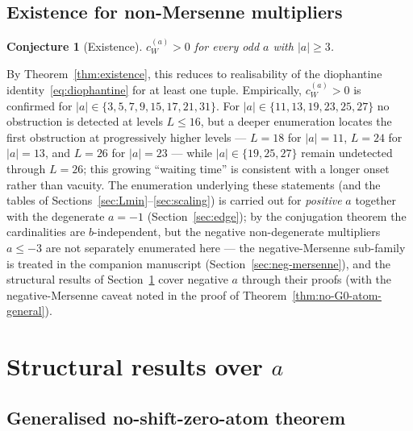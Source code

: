 \documentclass[11pt,reqno]{amsart}
\theoremstyle{plain}
\newtheorem{conjecture}[theorem]{Conjecture}
\theoremstyle{definition}
\theoremstyle{remark}
\newcommand{\cWa}{c_{W}^{(a)}}
\begin{document}
\subsection{Existence for non-Mersenne multipliers}

\begin{conjecture}[Existence]\label{conj:existence}
$\cWa > 0$ for every odd $a$ with $\lvert a \rvert \ge 3$.
\end{conjecture}

By Theorem~\ref{thm:existence}, this reduces to realisability of the
diophantine identity~\eqref{eq:diophantine} for at least one tuple.
Empirically, $\cWa > 0$ is confirmed for $\lvert a \rvert \in \{3, 5,
7, 9, 15, 17, 21, 31\}$. For $\lvert a \rvert \in \{11, 13, 19, 23, 25,
27\}$ no obstruction is detected at levels $L \le 16$, but a deeper
enumeration locates the first obstruction at progressively higher
levels --- $L = 18$ for $\lvert a \rvert = 11$, $L = 24$ for
$\lvert a \rvert = 13$, and $L = 26$ for $\lvert a \rvert = 23$ ---
while $\lvert a \rvert \in \{19, 25, 27\}$ remain undetected through
$L = 26$; this growing ``waiting time'' is consistent with a longer
onset rather than vacuity. The enumeration
underlying these statements (and the tables of
Sections~\ref{sec:Lmin}--\ref{sec:scaling}) is carried out for
\emph{positive} $a$ together with the degenerate $a = -1$
(Section~\ref{sec:edge}); by the conjugation theorem the cardinalities
are $b$-independent, but the negative non-degenerate multipliers
$a \le -3$ are not separately enumerated here --- the negative-Mersenne
sub-family is treated in the companion manuscript
(Section~\ref{sec:neg-mersenne}), and the structural results of
Section~\ref{sec:structure} cover negative $a$ through their proofs (with
the negative-Mersenne caveat noted in the proof of
Theorem~\ref{thm:no-G0-atom-general}).

\section{Structural results over \texorpdfstring{$a$}{a}}\label{sec:structure}

\subsection{Generalised no-shift-zero-atom theorem}
\end{document}
